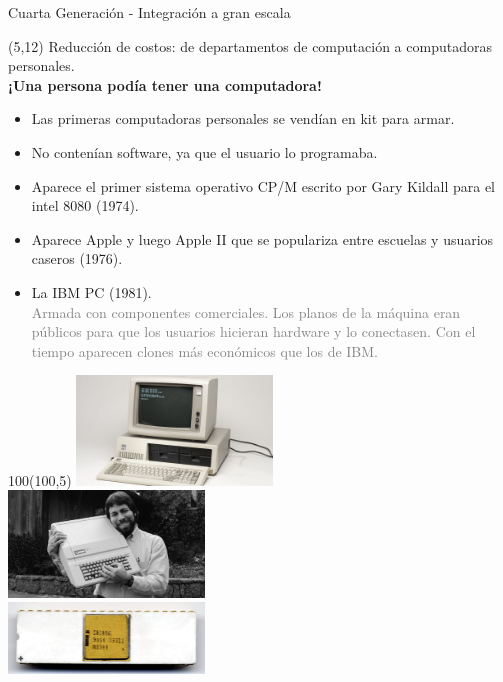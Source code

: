 \documentclass[aspectratio=169]{beamer}
\begin{document}
\begin{frame}[fragile,t]{Cuarta Generación - Integración a gran escala}
    \begin{textblock}{90}(5,12)
    Reducción de costos: \textcolor{naranjauca}{de departamentos de computación a computadoras personales}.\\
    \textbf{¡Una persona podía tener una computadora!}\\
    \begin{itemize}
    \setlength\itemsep{0.1cm}
    \small
    \item<2-> Las primeras computadoras personales se vendían en kit para armar.
    \item<3-> No contenían software, ya que el usuario lo programaba.
    \item<4-> Aparece el primer sistema operativo CP/M escrito por Gary Kildall para el intel 8080 (1974).
    \item<5-> Aparece Apple y luego Apple II que se populariza entre escuelas y usuarios caseros (1976).
    \item<6-> La IBM PC (1981).\\
    \textcolor{gray}{
    Armada con componentes comerciales.
    Los planos de la máquina eran públicos para que los usuarios hicieran hardware y lo conectasen.
    Con el tiempo aparecen clones más económicos que los de IBM.}
    \end{itemize}
    \end{textblock}
    \begin{textblock}{100}(100,5)
    \includegraphics[width=5.2cm]{img/IBMPC.jpg}\\
    \vspace{0.1cm}
    \includegraphics[width=5.2cm]{img/steve-wozniak-apple-1.jpg}\\
    \vspace{0.1cm}
    \includegraphics[width=5.2cm]{img/Intel_C8080A.jpg}\\
    \end{textblock}
\end{frame}
\end{document}
